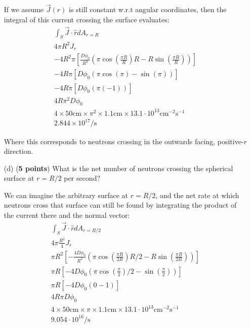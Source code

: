 \documentclass[11pt]{article}
\newcommand{\ans}[1]{{\color{violet}#1}}
\begin{document}
\begin{enumerate}
{    If we assume $\vec{J}(r)$ is still constant w.r.t angular coordinates, then the integral of this current crossing the surface evaluates:
    \begin{gather*}
        \int_{S}\vec{J}\cdot\hat{r}dA_{r=R} \\
        4\pi R^2 J_r \\
        -4R^2\pi \left[\frac{D\phi_0}{R^2}\left(\pi\cos{\left(\frac{\pi R}{R}\right)}R - R\sin{\left(\frac{\pi R}{R}\right)}\right)\right]\\
        -4R\pi \left[D\phi_0\left(\pi\cos{\left(\pi\right)} - \sin{\left(\pi\right)}\right)\right]\\
        -4R\pi \left[D\phi_0\left(\pi(-1)\right)\right]\\
        \boxed{4R\pi^2 D\phi_0}\\
        4\times50\mathrm{cm}\times\pi^2\times1.1\mathrm{cm}\times13.1\cdot10^{13}\mathrm{cm^{-2}s^{-1}} \\
        \boxed{2.844\times10^{17}/\mathrm{s}}
    \end{gather*}

    Where this corresponds to neutrons crossing in the outwards facing, positive-$r$ direction.
}
\item[(d)] ({\bf 5 points}) What is the net number of neutrons crossing the spherical surface at $r=R/2$ per second?
\item[] \ans{
    We can imagine the arbitrary surface at $r=R/2$, and the net rate at which neutrons cross that surface can still be found by integrating the product of the current there and the normal vector:
    \begin{gather*}
        \int_{S}\vec{J}\cdot\hat{r}dA_{r=R/2} \\
        4\pi \frac{R^2}{4} J_r \\
        \pi R^2 \left[-\frac{4D\phi_0}{R^2}\left(\pi\cos{\left(\frac{\pi R}{2R}\right)}R/2 - R\sin{\left(\frac{\pi R}{2R}\right)}\right)\right]\\
        \pi R \left[-4D\phi_0\left(\pi\cos{\left(\frac{\pi}{2}\right)}/2 - \sin{\left(\frac{\pi}{2}\right)}\right)\right]\\
        \pi R \left[-4D\phi_0\left(0-1\right)\right]\\ 
        \boxed{4R\pi D\phi_0}\\ 
        4\times50\mathrm{cm}\times\pi\times1.1\mathrm{cm}\times13.1\cdot10^{13}\mathrm{cm^{-2}s^{-1}} \\
        \boxed{9.054\cdot10^{16}/\mathrm{s}}
    \end{gather*}

}
\end{enumerate}
\end{document}
